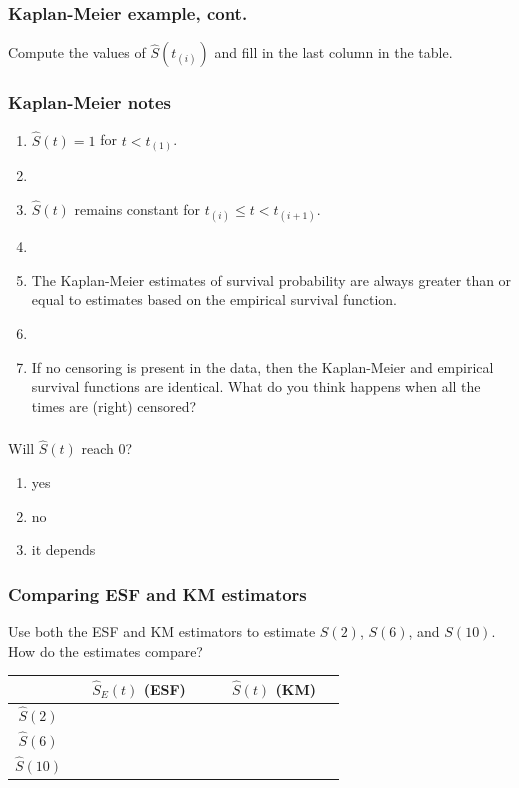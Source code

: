 \begin{frame}
\frametitle{Kaplan-Meier example, cont.}
Compute the values of $\widehat{S}(t_{(i)})$ and fill in the last column in the table.
\vskip200pt
\end{frame}

\begin{frame}
\frametitle{Kaplan-Meier notes}
\begin{enumerate}
\item $\widehat{S}(t)=1$ for $t < t_{(1)}$.
\item[]
\item $\widehat{S}(t)$ remains constant for $t_{(i)} \leq t < t_{(i+1)}$.
\item[]
\item The Kaplan-Meier estimates of survival probability are always greater than or equal to estimates based on the empirical survival function.
\item[]
\item If no censoring is present in the data, then the Kaplan-Meier and empirical survival functions are identical. What do you think happens when all the times are (right) censored?
\end{enumerate}
\end{frame}

\begin{frame}
\frametitle{\grp}
\begin{clicker}{Will $\widehat{S}(t)$ reach 0?}
\begin{enumerate}
\item yes
\item no
\item it depends %
\end{enumerate}
\end{clicker}
\vskip100pt
\end{frame}

\begin{frame}
\frametitle{Comparing ESF and KM estimators}
Use both the ESF and KM estimators to estimate $S(2)$, $S(6)$, and $S(10)$.  How do the estimates compare?
\vskip10pt
{\renewcommand{\arraystretch}{2.0}
\begin{tabular}{|c|c|c|}
\hline
 & ~~$\widehat{S}_E(t)$ (ESF)~~ & ~~$\widehat{S}(t)$ (KM)~~ \\
 \hline
$\hat{S}(2)$ & & \\
\hline
$\hat{S}(6)$ & & \\
\hline
$\hat{S}(10)$& & \\
\hline
\end{tabular}}
\end{frame}


